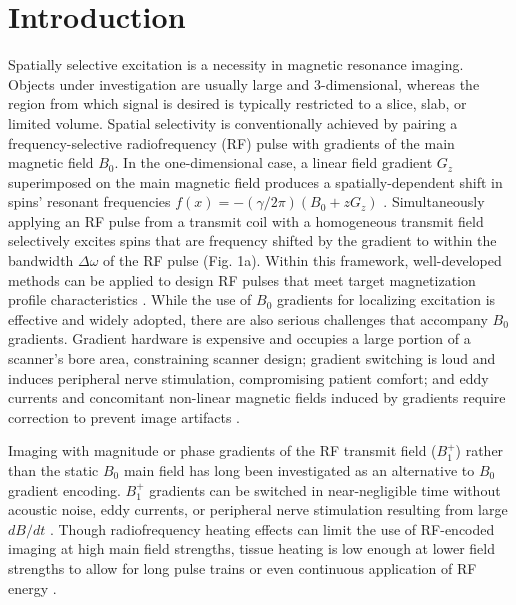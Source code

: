 \documentclass{article}
\begin{document}
\section{Introduction}
Spatially selective excitation is a necessity in magnetic resonance imaging. 
Objects under investigation are usually large and 3-dimensional, 
whereas the region from which signal is desired is typically restricted to a slice, slab, or limited volume. 
Spatial selectivity is conventionally achieved by pairing a frequency-selective radiofrequency (RF) 
pulse with gradients of the main magnetic field $B_0$. 
In the one-dimensional case, 
a linear field gradient $G_z$ superimposed on the main magnetic field produces a spatially-dependent shift in spins' resonant frequencies $f(x) = -(\gamma/2\pi)(B_0 + zG_z)$ \cite{Mansfield1977Multi-planarEchoes}. 
Simultaneously applying an RF pulse from a transmit coil with a homogeneous 
transmit field selectively excites spins that are frequency shifted by the gradient to within the bandwidth $\Delta\omega$ of the RF pulse (Fig. 1a). Within this framework, 
well-developed methods can be applied to design RF pulses that meet 
target magnetization profile characteristics \cite{Conolly1986OptimalProblem, Pauly1991ParameterAlgorithm}. 
While the use of $B_0$ gradients for localizing excitation is effective and widely adopted, 
there are also serious challenges that accompany $B_0$ gradients. 
Gradient hardware is expensive and occupies a large portion of a scanner's bore area, 
constraining scanner design; gradient switching is loud and induces peripheral nerve stimulation, 
compromising patient comfort; and eddy currents and concomitant non-linear magnetic fields induced by gradients require correction to prevent image artifacts \cite{Bernstein1998ConcomitantCorrection, Spees2011QuantificationGradients}.

\par Imaging with magnitude or phase gradients of the RF transmit field ($B_1^+$) rather than the static $B_0$ main field has long been investigated as an alternative \cite{Hoult1979RotatingZeugmatography,Sharp2010MRIGradients,Kartausch2014SpatialEffect, Torres2021B1-gradientbasedEchoes} to $B_0$ gradient encoding. 
$B_1^+$ gradients can be switched in near-negligible time without acoustic noise, eddy currents, 
or peripheral nerve stimulation resulting from large $dB/dt$ \cite{Canet1997RadiofrequencyExperiments}. 
Though radiofrequency heating effects can limit the use of RF-encoded imaging at high main field strengths, 
tissue heating is low enough at lower field strengths to allow for long pulse trains or even continuous application of RF energy \cite{Kartausch2014SpatialEffect}. 
\end{document}
